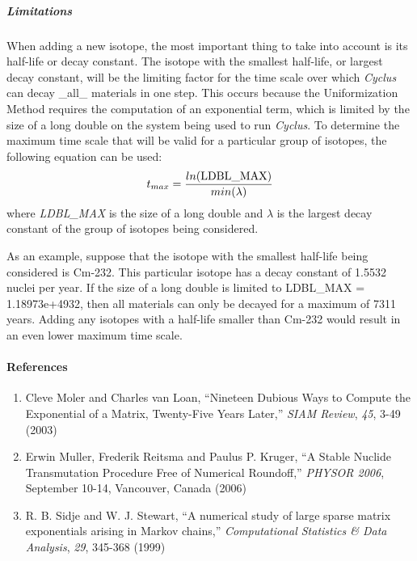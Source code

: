 \documentclass[letterpaper,10pt,english]{sphinxmanual}
\begin{document}
\subparagraph{Limitations}
\label{devdoc/decay:limitations}
When adding a new isotope, the most important thing to take into account is its
half-life or decay constant.  The isotope with the smallest half-life, or
largest decay constant, will be the limiting factor for the time scale over
which \emph{Cyclus} can decay \_all\_ materials in one step.  This occurs because the
Uniformization Method requires the computation of an exponential term, which is
limited by the size of a long double on the system being used to run \emph{Cyclus}.
To determine the maximum time scale that will be valid for a particular group
of isotopes, the following equation can be used:
\begin{gather}
\begin{split}{t_{max} = \frac{ln(\textrm{LDBL\_MAX})}{min(\lambda)}}\end{split}\notag
\end{gather}
where \emph{LDBL\_MAX} is the size of a long double and $\lambda$ is the
largest decay constant of the group of isotopes being considered.

As an example, suppose that the isotope with the smallest half-life being
considered is Cm-232.  This particular isotope has a decay constant of 1.5532
nuclei per year.  If the size of a long double is limited to LDBL\_MAX =
1.18973e+4932, then all materials can only be decayed for a maximum of 7311
years.  Adding any isotopes with a half-life smaller than Cm-232 would result
in an even lower maximum time scale.


\paragraph{References}
\label{devdoc/decay:references}\begin{enumerate}
\item {} 
Cleve Moler and Charles van Loan, ``Nineteen Dubious Ways to Compute the
Exponential of a Matrix, Twenty-Five Years Later,'' \emph{SIAM Review}, \emph{45},
3-49 (2003)

\item {} 
Erwin Muller, Frederik Reitsma and Paulus P. Kruger, ``A Stable Nuclide
Transmutation Procedure Free of Numerical Roundoff,'' \emph{PHYSOR 2006}, September
10-14, Vancouver, Canada (2006)

\item {} 
R. B. Sidje and W. J. Stewart, ``A numerical study of large sparse matrix
exponentials arising in Markov chains,'' \emph{Computational Statistics \& Data
Analysis}, \emph{29}, 345-368 (1999)

\end{enumerate}
\end{document}
